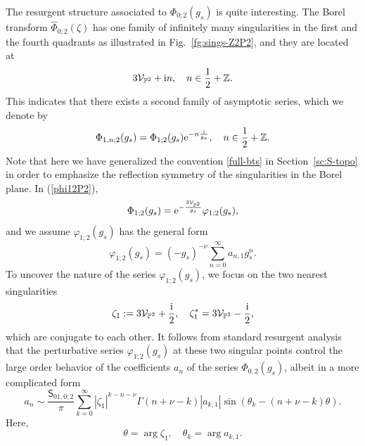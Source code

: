\documentclass[a4paper,11pt]{article}
\theoremstyle{definition}
\newcommand{\CV}{{\cal V}}
\def\IZ{{\mathbb Z}}
\def\IP{{\mathbb P}}
\newcommand{\re}{{\rm e}}
\newcommand{\ri}{{\rm i}}
\newcommand{\wh}[1]{\widehat{#1}}
\def\ms{\mathsf}
\begin{document}
The resurgent structure associated to $\Phi_{0;2}(g_s)$ is quite
interesting.  The Borel transform $\wh{\Phi}_{0;2}(\zeta)$ has one
family of infinitely many singularities in the first and the fourth
quadrants as illustrated in Fig.~\ref{fg:sings-Z2P2}, and they are
located at
\begin{equation}
  3\CV_{\IP^2}+\ri n,\quad n\in\frac{1}{2}+\IZ.
\end{equation}
This indicates that there exists a
second family of asymptotic series, which we denote by
\begin{equation}
\label{phi12P2}
  \Phi_{1,n;2}(g_s) = \Phi_{1;2}(g_s)\re^{-n\frac{\ri}{g_s}},\quad
  n\in \frac{1}{2}+\IZ.
\end{equation}
Note that here we have generalized the convention \eqref{full-bts} in
Section~\ref{sc:S-topo} in order to emphasize the reflection symmetry of
the singularities in the Borel plane. In (\ref{phi12P2}), 
%
\begin{equation}
  \Phi_{1;2}(g_s) =
  \re^{-\frac{3\CV_{\IP^2}}{g_s}}
  \varphi_{1;2}(g_s),
\end{equation}
and we assume $ \varphi_{1;2}(g_s)$ has the general form
\begin{equation}
  \varphi_{1;2}(g_s) = (-g_s)^{-\nu}\sum_{n=0}^\infty a_{n,1} g_s^n.
\end{equation}
To uncover the nature of the series $\varphi_{1;2}(g_s)$, we focus on
the two nearest singularities
\begin{equation}
  \zeta_1:=3\CV_{\IP^2}+\frac{\ri}{2},\quad
  \zeta_1^* = 3\CV_{\IP^2}-\frac{\ri}{2},
\end{equation}
which are conjugate to each other. It follows from standard resurgent analysis that 
the perturbative series $\varphi_{1;2}(g_s)$ at these two
singular points control the large order behavior of the coefficients
$a_n$ of the series $\Phi_{0,2}(g_s)$, albeit in a more complicated
form
\begin{equation}
  a_n \sim \frac{\ms{S}_{01,0;2}}{\pi}
  \sum_{k=0}^\infty
  |\zeta_1|^{k-n-\nu}\Gamma(n+\nu-k)|a_{k,1}|\sin(\theta_k -
  (n+\nu-k)\theta). 
  \label{eq:an-asymp2}
\end{equation}
Here,
%
\begin{equation}
  \theta = \arg \zeta_1, \quad \theta_k = \arg a_{k,1}.
\end{equation}
\end{document}
